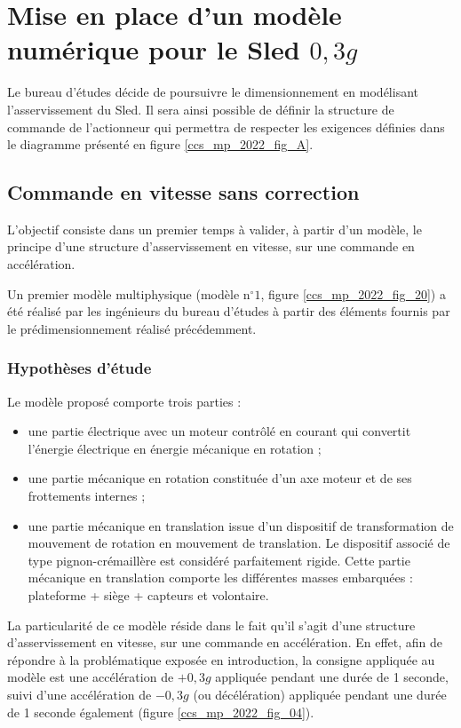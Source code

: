
\section{Mise en place d'un modèle numérique pour le Sled $0,3 g$ \label{ccs_mp_2022_sec_3}}

\ifprof
\else
Le bureau d'études décide de poursuivre le dimensionnement en modélisant l'asservissement du Sled. Il sera ainsi possible de définir la structure de commande de l'actionneur qui permettra de respecter les exigences définies dans le diagramme présenté en figure \ref{ccs_mp_2022_fig_A}.
\fi

\subsection{Commande en vitesse sans correction \label{ccs_mp_2022_sec_3A}}
\begin{obj}
L'objectif consiste dans un premier temps à valider, à partir d'un modèle, le principe d'une structure d'asservissement en vitesse, sur une commande en accélération.
\end{obj}

\ifprof
\else
Un premier modèle multiphysique (modèle $\mathrm{n}^{\circ} 1$, figure \ref{ccs_mp_2022_fig_20}) a été réalisé par les ingénieurs du bureau d'études à partir des éléments fournis par le prédimensionnement réalisé précédemment.

\subsubsection*{Hypothèses d'étude}
Le modèle proposé comporte trois parties :
\begin{itemize}
  \item une partie électrique avec un moteur contrôlé en courant qui convertit l'énergie électrique en énergie mécanique en rotation ;
  \item une partie mécanique en rotation constituée d'un axe moteur et de ses frottements internes ;
  \item une partie mécanique en translation issue d'un dispositif de transformation de mouvement de rotation en mouvement de translation. Le dispositif associé de type pignon-crémaillère est considéré parfaitement rigide. Cette partie mécanique en translation comporte les différentes masses embarquées : plateforme + siège + capteurs et volontaire.
\end{itemize}

La particularité de ce modèle réside dans le fait qu'il s'agit d'une structure d'asservissement en vitesse, sur une commande en accélération. En effet, afin de répondre à la problématique exposée en introduction, la consigne appliquée au modèle est une accélération de $+0,3 g$ appliquée pendant une durée de 1 seconde, suivi d'une accélération de $-0,3 g$ (ou décélération) appliquée pendant une durée de 1 seconde également (figure \ref{ccs_mp_2022_fig_04}).

